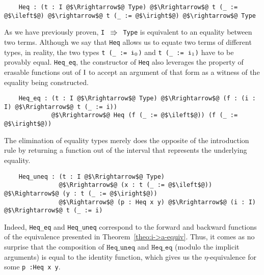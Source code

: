 \documentclass[12pt,twoside,maitrise]{dms}
\theoremstyle{definition}
\numberwithin{equation}{section}
\numberwithin{table}{chapter}
\numberwithin{figure}{chapter}
\newcommand\id[1] {\texttt{#1}}
\newcommand\fn[1] {\texttt{#1}}
\begin{document}
\begin{verbatim}
    Heq : (t : I @$\Rrightarrow$@ Type) @$\Rrightarrow$@ t (_ := @$\ileft$@) @$\rightarrow$@ t (_ := @$\iright$@) @$\rightarrow$@ Type
\end{verbatim}

As we have previously proven, \fn{I $\Rrightarrow$ Type} is equivalent to an
equality between two terms. Although we say that \fn{Heq} allows us to equate
two terms of different types, in reality, the two types \fn{t (\_ := $\ileft$)} and
\fn{t (\_ := $\iright$)} have to be provably equal. \id{Heq\_eq}, the constructor of
\id{Heq} also leverages the property of erasable functions out of $\mathrm{I}$ to
accept an argument of that form as a witness of the equality being constructed.


\begin{verbatim}
    Heq_eq : (t : I @$\Rrightarrow$@ Type) @$\Rrightarrow$@ (f : (i : I) @$\Rrightarrow$@ t (_ := i))
             @$\Rrightarrow$@ Heq (f (_ := @$\ileft$@)) (f (_ := @$\iright$@))
\end{verbatim}

The elimination of equality types merely does the opposite of the introduction
rule by returning a function out of the interval that represents the underlying
equality.

\begin{verbatim}
    Heq_uneq : (t : I @$\Rrightarrow$@ Type)
               @$\Rrightarrow$@ (x : t (_ := @$\ileft$@)) @$\Rightarrow$@ (y : t (_ := @$\iright$@))
               @$\Rightarrow$@ (p : Heq x y) @$\Rrightarrow$@ (i : I) @$\Rrightarrow$@ t (_ := i)
\end{verbatim}

Indeed, \id{Heq\_eq} and \id{Heq\_uneq} correspond to the forward and backward
functions of the equivalence presented in Theorem~\ref{theo:i->a-equiv}. Thus,
it comes as no surprise that the composition of $\id{Heq\_uneq}$ and
$\id{Heq\_eq}$ (modulo the implicit arguments) is equal to the identity
function, which gives us the $\eta$-equivalence for some \fn{p :\@ Heq x y}.
\end{document}
